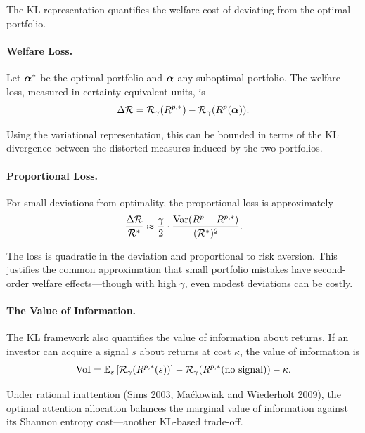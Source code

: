 The KL representation quantifies the welfare cost of deviating from the optimal portfolio.

\paragraph{Welfare Loss.}

Let $\boldsymbol{\alpha}^{*}$ be the optimal portfolio and $\boldsymbol{\alpha}$ any suboptimal portfolio. The welfare loss, measured in certainty-equivalent units, is
\begin{equation}
\Delta \mathcal{R} = \mathcal{R}_{\gamma}(R^{p,*}) - \mathcal{R}_{\gamma}(R^p(\boldsymbol{\alpha})).
\label{eq:welfare-loss}
\end{equation}

Using the variational representation, this can be bounded in terms of the KL divergence between the distorted measures induced by the two portfolios.

\paragraph{Proportional Loss.}

For small deviations from optimality, the proportional loss is approximately
\begin{equation}
\frac{\Delta \mathcal{R}}{\mathcal{R}^{*}} \approx \frac{\gamma}{2} \cdot \frac{\mathrm{Var}(R^p - R^{p,*})}{(\mathcal{R}^{*})^2}.
\label{eq:proportional-loss}
\end{equation}

The loss is quadratic in the deviation and proportional to risk aversion. This justifies the common approximation that small portfolio mistakes have second-order welfare effects---though with high $\gamma$, even modest deviations can be costly.

\paragraph{The Value of Information.}

The KL framework also quantifies the value of information about returns. If an investor can acquire a signal $s$ about returns at cost $\kappa$, the value of information is
\begin{equation}
\text{VoI} = \mathbb{E}_s\left[ \mathcal{R}_{\gamma}(R^{p,*}(s)) \right] - \mathcal{R}_{\gamma}(R^{p,*}(\text{no signal})) - \kappa.
\label{eq:value-of-info}
\end{equation}

Under rational inattention (Sims 2003, Ma\'{c}kowiak and Wiederholt 2009), the optimal attention allocation balances the marginal value of information against its Shannon entropy cost---another KL-based trade-off.


